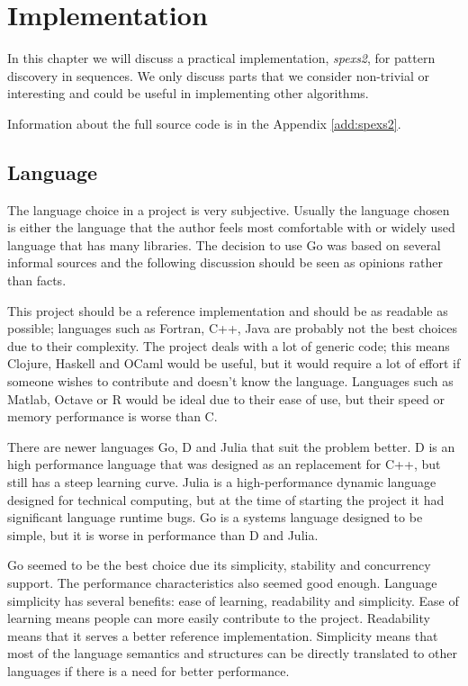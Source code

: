 \chapter{Implementation}
\label{c:implementation}

In this chapter we will discuss a practical implementation, \emph{spexs2}, for pattern discovery in sequences. We only discuss parts that we consider non-trivial or interesting and could be useful in implementing other algorithms.

Information about the full source code is in the Appendix \ref{add:spexs2}.

\section{Language}

The language choice in a project is very subjective. Usually the language chosen is either the language that the author feels most comfortable with or widely used language that has many libraries. The decision to use Go was based on several informal sources\cite{HammerPrinciple,LanguageShootout,LoopRecognition,go,clojure,julia} and the following discussion should be seen as opinions rather than facts.

This project should be a reference implementation and should be as readable as possible; languages such as Fortran, C++, Java are probably not the best choices due to their complexity. The project deals with a lot of generic code; this means Clojure, Haskell and OCaml would be useful, but it would require a lot of effort if someone wishes to contribute and doesn't know the language. Languages such as Matlab, Octave or R would be ideal due to their ease of use, but their speed or memory performance is worse than C.

There are newer languages Go, D and Julia that suit the problem better. D is an high performance language that was designed as an replacement for C++, but still has a steep learning curve. Julia is a high-performance dynamic language designed for technical computing, but at the time of starting the project it had significant language runtime bugs. Go is a systems language designed to be simple, but it is worse in performance than D and Julia.

Go seemed to be the best choice due its simplicity, stability and concurrency support. The performance characteristics also seemed good enough. Language simplicity has several benefits: ease of learning, readability and simplicity. Ease of learning means people can more easily contribute to the project. Readability means that it serves a better reference implementation. Simplicity means that most of the language semantics and structures can be directly translated to other languages if there is a need for better performance.

